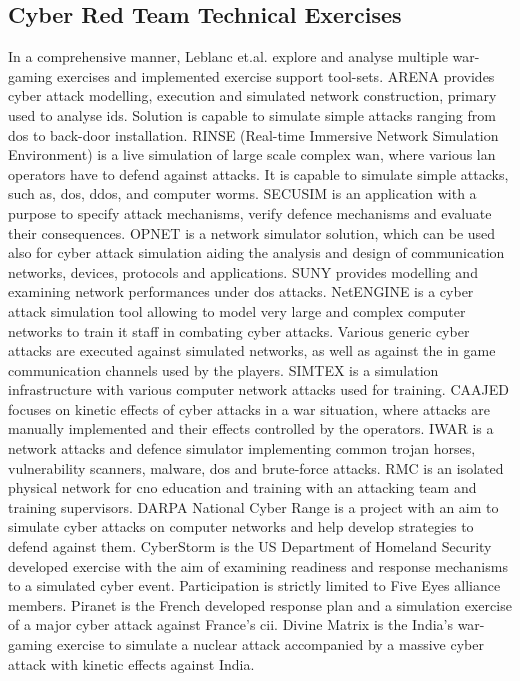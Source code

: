 \subsection{Cyber Red Team Technical Exercises}
\label{sec:exercise-work}
\glsresetall
In a comprehensive manner, Leblanc et.al. \cite{Leblanc2011} explore and analyse multiple war-gaming exercises and implemented exercise support tool-sets.
ARENA provides cyber attack modelling, execution and simulated network construction, primary used to analyse \gls{ids}. Solution is capable to simulate simple attacks ranging from \gls{dos} to back-door installation.
RINSE (Real-time Immersive Network Simulation Environment) is a live simulation of large scale complex \gls{wan}, where various \gls{lan} operators have to defend against attacks. It is capable to simulate simple attacks, such as, \gls{dos}, \gls{ddos}, and computer worms.
SECUSIM is an application with a purpose to specify attack mechanisms, verify defence mechanisms and evaluate their consequences.
OPNET is a network simulator solution, which can be used also for cyber attack simulation aiding the analysis and design of communication networks, devices, protocols and applications.
SUNY provides modelling and examining network performances under \gls{dos} attacks.
NetENGINE is a cyber attack simulation tool allowing to model very large and complex computer networks to train \gls{it} staff in combating cyber attacks. Various generic cyber attacks are executed against simulated networks, as well as against the in game communication channels used by the players.
SIMTEX is a simulation infrastructure with various computer network attacks used for training.
CAAJED focuses on kinetic effects of cyber attacks in a war situation, where attacks are manually implemented and their effects controlled by the operators. 
IWAR is a network attacks and defence simulator implementing common trojan horses, vulnerability scanners, malware, \gls{dos} and brute-force attacks.
RMC is an isolated physical network for \gls{cno} education and training with an attacking team and training supervisors.
DARPA National Cyber Range is a project with an aim to simulate cyber attacks on computer networks and help develop strategies to defend against them.
CyberStorm is the US Department of Homeland Security developed exercise with the aim of examining readiness and response mechanisms to a simulated cyber event. Participation is strictly limited to Five Eyes alliance members.
Piranet is the French developed response plan and a simulation exercise of a major cyber attack against France's \gls{cii}.
Divine Matrix is the India's war-gaming exercise to simulate a nuclear attack accompanied by a massive cyber attack with kinetic effects against India.

